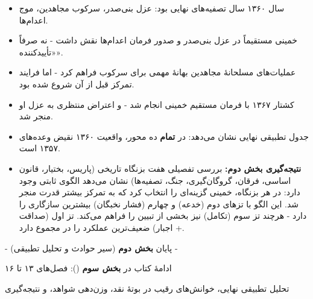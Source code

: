 \documentclass[12pt,a4paper]{book}
\newcommand{\keyword}[1]{\textbf{\textcolor{cPrimary}{#1}}}
\newcommand{\en}[1]{\lr{\textit{#1}}}
\begin{document}
\begin{principleBox}
\begin{itemize}[label=\textcolor{cPrimary}{$\blacksquare$}, rightmargin=2em]
    \item سال ۱۳۶۰ سال تصفیه‌های نهایی بود: عزل بنی‌صدر، سرکوب مجاهدین، موج اعدام‌ها.
    \item خمینی مستقیماً در عزل بنی‌صدر و صدور فرمان اعدام‌ها نقش داشت - نه صرفاً «تأییدکننده».
    \item عملیات‌های مسلحانهٔ مجاهدین بهانهٔ مهمی برای سرکوب فراهم کرد - اما فرایند تمرکز قبل از آن شروع شده بود.
    \item کشتار ۱۳۶۷ با فرمان مستقیم خمینی انجام شد - و اعتراض منتظری به عزل او منجر شد.
    \item جدول تطبیقی نهایی نشان می‌دهد: در \keyword{تمام} ده محور، واقعیت ۱۳۶۰ نقیض وعده‌های ۱۳۵۷ است.
    \item \keyword{نتیجه‌گیری بخش دوم:} بررسی تفصیلی هفت بزنگاه تاریخی (پاریس، بختیار، قانون اساسی، فرقان، گروگان‌گیری، جنگ، تصفیه‌ها) نشان می‌دهد الگوی ثابتی وجود دارد: در هر بزنگاه، خمینی گزینه‌ای را انتخاب کرد که به تمرکز بیشتر قدرت منجر شد. این الگو با تزهای دوم (خدعه) و چهارم (فشار نخبگان) بیشترین سازگاری را دارد - هرچند تز سوم (تکامل) نیز بخشی از تبیین را فراهم می‌کند. تز اول (صداقت + اجبار) ضعیف‌ترین عملکرد را در مجموع دارد.
\end{itemize}
\end{principleBox}

\vspace{1cm}

\begin{center}

\vspace{0.5cm}
{\small\color{cGray} - پایان \textbf{بخش دوم} (سیر حوادث و تحلیل تطبیقی) -}

\vspace{0.3cm}
{\small\color{cGray} ادامهٔ کتاب در \textbf{بخش سوم} (\en{Segment 4}): فصل‌های ۱۳ تا ۱۶}

\vspace{0.2cm}
{\small\color{cGray} تحلیل تطبیقی نهایی، خوانش‌های رقیب در بوتهٔ نقد، وزن‌دهی شواهد، و نتیجه‌گیری}
\end{center}

\end{document}
